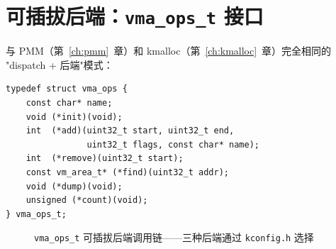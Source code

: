 \section{可插拔后端：\texttt{vma\_ops\_t} 接口}

与 PMM（第~\ref{ch:pmm}~章）和 kmalloc（第~\ref{ch:kmalloc}~章）完全相同的
"dispatch + 后端"模式：

\begin{lstlisting}[style=cstyle]
typedef struct vma_ops {
    const char* name;
    void (*init)(void);
    int  (*add)(uint32_t start, uint32_t end,
                uint32_t flags, const char* name);
    int  (*remove)(uint32_t start);
    const vm_area_t* (*find)(uint32_t addr);
    void (*dump)(void);
    unsigned (*count)(void);
} vma_ops_t;
\end{lstlisting}

\begin{figure}[H]
  \centering
  
  \caption{\texttt{vma\_ops\_t} 可插拔后端调用链——三种后端通过 \texttt{kconfig.h} 选择}
  \label{fig:vma-dispatch}
\end{figure}


